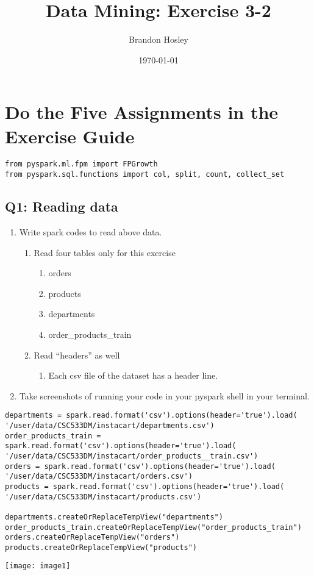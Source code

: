 \documentclass[]{article}
\title{Data Mining: Exercise 3-2}
\author{Brandon Hosley}
\date{\today}
\begin{document}
\maketitle

\section*{Do the Five Assignments in the Exercise Guide}

\begin{verbatim}
from pyspark.ml.fpm import FPGrowth
from pyspark.sql.functions import col, split, count, collect_set
\end{verbatim}

\clearpage

\subsection*{Q1: Reading data}
\begin{enumerate}[before=\itshape,label=\arabic*.]
	\item Write spark codes to read above data.
	\begin{enumerate}[before=\itshape,label=\alph*.]
		\item Read four tables only for this exercise
		\begin{enumerate}[before=\itshape,label=\roman*.]
			\item orders
			\item products
			\item departments
			\item order\_products\_train
		\end{enumerate}
		\item Read “headers” as well
		\begin{enumerate}[before=\itshape,label=\roman*.]
			\item Each csv file of the dataset has a header line.
		\end{enumerate}
	\end{enumerate}
	\item Take screenshots of running your code in your pyspark shell in your terminal.
\end{enumerate} 

\begin{verbatim}
departments = spark.read.format('csv').options(header='true').load( '/user/data/CSC533DM/instacart/departments.csv')
order_products_train = spark.read.format('csv').options(header='true').load( '/user/data/CSC533DM/instacart/order_products__train.csv')
orders = spark.read.format('csv').options(header='true').load( '/user/data/CSC533DM/instacart/orders.csv')
products = spark.read.format('csv').options(header='true').load( '/user/data/CSC533DM/instacart/products.csv')

departments.createOrReplaceTempView("departments")
order_products_train.createOrReplaceTempView("order_products_train")
orders.createOrReplaceTempView("orders")
products.createOrReplaceTempView("products")
\end{verbatim}
\texttt{[image: image1]}
\end{document}
